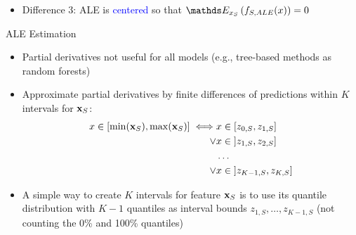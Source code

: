 \documentclass[11pt,compress,t,notes=noshow, aspectratio=169, xcolor=table]{beamer}
\begin{document}
{\begin{itemize}
{    }
    \item<3-> Difference 3: ALE is \textcolor{blue}{centered} so that $\E_{x_S} \left( f_{S, ALE}(x) \right) = 0$
    \end{itemize}
}


\begin{frame}{ALE Estimation}

\begin{itemize}
  \item Partial derivatives not useful for all models (e.g., tree-based methods as random forests)
  \item Approximate partial derivatives by finite differences of predictions within $K$ intervals for $\xv_S$:
  $$
  \begin{aligned}
  x \in [\min(\xv_S), \max(\xv_S)] \iff &x \in [z_{0, S}, z_{1, S}] \\
  \lor &x \in \; ]z_{1, S}, z_{2, S}] \\
  &\dots \\
  \lor &x \in \; ]z_{K-1, S}, z_{K, S}]
  \end{aligned}
  $$
  \item A simple way to create $K$ intervals for feature $\xv_S$ is to use its quantile distribution with $K-1$ quantiles as interval bounds $z_{1,S}, \dots, z_{K-1,S}$ (not counting the 0\% and 100\% quantiles)
\end{itemize}

\end{frame}
\end{document}
